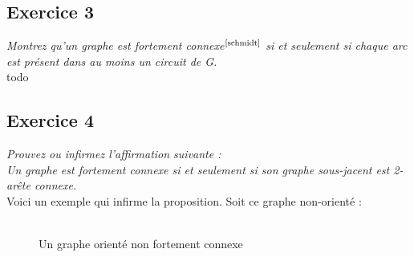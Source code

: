 \documentclass{article}      %
\begin{document}
\subsection{Exercice 3}
\textit{\textcolor{exogris}{
Montrez qu’un graphe est fortement connexe$^\text{\cite{schmidt}}$ si et seulement si chaque arc est présent dans au moins un circuit de G.
}}
\\todo



\subsection{Exercice 4}
\textit{\textcolor{exogris}{
Prouvez ou infirmez l’affirmation suivante :
\\Un graphe est fortement connexe si et seulement si son graphe sous-jacent est 2-arête connexe.
}}
\\Voici un exemple qui infirme la proposition.
Soit ce graphe non-orienté :

\begin{figure}[H]
    \centering
    \\Un graphe orienté non fortement connexe
\end{figure}
\end{document}

